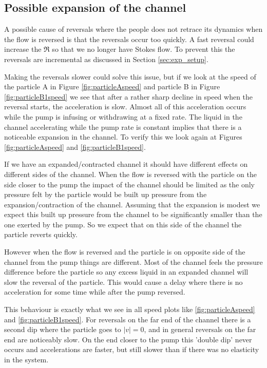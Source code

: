 \subsection{Possible expansion of the channel}
A possible cause of reversals where the people does not retrace its dynamics when the flow is reversed is that the reversals occur too quickly. A fast reversal could increase the $\Re$ so that we no longer have Stokes flow. To prevent this the reversals are incremental as discussed in Section \ref{sec:exp_setup}. 

Making the reversals slower could solve this issue, but if we look at the speed of the particle A in Figure \ref{fig:particleAspeed} and particle B in Figure \ref{fig:particleB1speed} we see that after a rather 
sharp decline in speed when the reversal starts, the acceleration is slow. Almost all of this acceleration occurs while the pump is 
infusing or withdrawing at a fixed rate. The liquid in the channel accelerating while the pump rate is constant implies that there 
is a noticeable expansion in the channel. To verify this we look again at Figures
\ref{fig:particleAspeed} and \ref{fig:particleB1speed}.

If we have an expanded/contracted channel it should have different effects on different sides of the channel. When the flow is reversed with the particle on the side closer to the pump the impact of the channel should be limited as the only pressure felt by the particle would be built up pressure from the expansion/contraction of the channel. Assuming that the expansion is modest we expect this built up pressure from the channel to be significantly smaller than the one exerted by the pump. So we expect that on this side of the channel the particle reverts quickly.

However when the flow is reversed and the particle is on opposite side of the channel from the pump things are different. Most of the channel feels the pressure difference before the particle so any excess liquid in an expanded channel will slow the reversal of the particle. This would cause a delay where there is no acceleration for some time while after the pump reversed. 

This behaviour is exactly what we see in all speed plots like \ref{fig:particleAspeed} and \ref{fig:particleB1speed}. 
For reversals on the far end of the channel there is a second dip where the particle goes to $\left|v\right|=0$, and in general reversals on the far end are noticeably slow. On the end closer to the pump this 'double dip' never occurs and accelerations are faster, but still slower than if there was no elasticity in the system.


